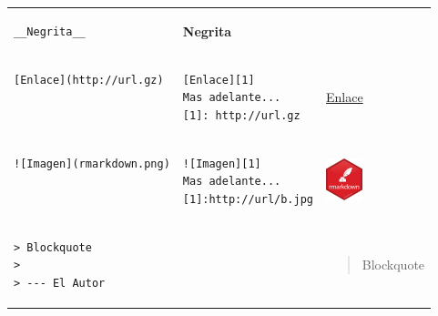\documentclass[]{book}
\theoremstyle{definition}
\theoremstyle{definition}
\theoremstyle{definition}
\theoremstyle{remark}
\begin{document}
\begin{longtable}[]{@{}lll@{}}
\begin{minipage}[t]{0.32\columnwidth}
\begin{verbatim}
__Negrita__
\end{verbatim}
\strut
\end{minipage} & \begin{minipage}[t]{0.32\columnwidth}\raggedright\strut
\textbf{Negrita}\strut
\end{minipage}\tabularnewline
\begin{minipage}[t]{0.32\columnwidth}\raggedright\strut
\begin{verbatim}
[Enlace](http://url.gz)
 
 
\end{verbatim}
\strut
\end{minipage} & \begin{minipage}[t]{0.32\columnwidth}\raggedright\strut
\begin{verbatim}
[Enlace][1]
Mas adelante...
[1]: http://url.gz
\end{verbatim}
\strut
\end{minipage} & \begin{minipage}[t]{0.32\columnwidth}\raggedright\strut
\href{http://rmark\%20down.rstudio.com}{Enlace}\strut
\end{minipage}\tabularnewline
\begin{minipage}[t]{0.32\columnwidth}\raggedright\strut
\begin{verbatim}
![Imagen](rmarkdown.png)
 
 
\end{verbatim}
\strut
\end{minipage} & \begin{minipage}[t]{0.32\columnwidth}\raggedright\strut
\begin{verbatim}
![Imagen][1]
Mas adelante...
[1]:http://url/b.jpg
\end{verbatim}
\strut
\end{minipage} & \begin{minipage}[t]{0.32\columnwidth}\raggedright\strut
\includegraphics{images/rmd.png}\strut
\end{minipage}\tabularnewline
\begin{minipage}[t]{0.32\columnwidth}\raggedright\strut
\begin{verbatim}
> Blockquote
>
> --- El Autor
\end{verbatim}
\strut
\end{minipage} & \begin{minipage}[t]{0.32\columnwidth}\raggedright\strut
\strut
\end{minipage} & \begin{minipage}[t]{0.32\columnwidth}\raggedright\strut
\begin{quote}
Blockquote


\end{quote}
\end{minipage}
\end{longtable}
\end{document}
